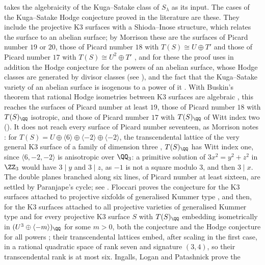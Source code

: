 \begin{remark}
\label{rem:mumfordks}
 takes the algebraicity of the Kuga--Satake class of
$S_{\lambda}$ as its input. The cases of the Kuga--Satake Hodge conjecture
proved in the literature are these. They include the projective K3 surfaces with
a Shioda--Inose structure, which relates the surface to an abelian surface;
by Morrison these are the surfaces of Picard number $19$ or $20$, those of
Picard number $18$ with $T(S)\cong U\oplus T'$ and those of Picard number
$17$ with $T(S)\cong U^{2}\oplus T'$
\cite[Theorem~6.3 and Corollary~6.4]{Mor84}, and for these the proof uses in
addition the Hodge conjecture for the powers of an abelian surface, whose
Hodge classes are generated by divisor classes (see \cite{MZ99}), and the
fact that the Kuga--Satake variety of an abelian surface is isogenous to a
power of it \cite{Mor85}. With Buskin's theorem that rational Hodge
isometries between K3 surfaces are algebraic \cite{Bus19}, this reaches the
surfaces of Picard number at least $19$, those of Picard number $18$ with
$T(S)_{\QQ}$ isotropic, and those of Picard number $17$ with $T(S)_{\QQ}$ of
Witt index two (). It does not reach every
surface of Picard number seventeen, as Morrison notes
\cite[Remark~7.2]{Mor84}: for
$T(S)=U\oplus\langle6\rangle\oplus\langle-2\rangle\oplus\langle-2\rangle$,
the transcendental lattice of the very general K3 surface of a family of
dimension three \cite[Corollary~2.10]{Mor84}, $T(S)_{\QQ}$ has Witt index one,
since $\langle6,-2,-2\rangle$ is anisotropic over $\QQ_{3}$: a primitive
solution of $3x^{2}=y^{2}+z^{2}$ in $\ZZ_{3}$ would have $3\mid y$ and
$3\mid z$, as $-1$ is not a square modulo $3$, and then $3\mid x$. The double planes branched along six lines, of Picard
number at least sixteen, are settled by Paranjape's cycle; see \cite{vG00}.
Floccari proves the conjecture for the K3 surfaces attached to projective
sixfolds of generalised Kummer type \cite{Flo24}, and then, for the K3
surfaces attached to all projective varieties of generalised Kummer type and
for every projective K3 surface $S$ with $T(S)_{\QQ}$ embedding isometrically
in $(U^{3}\oplus\langle-m\rangle)_{\QQ}$ for some $m>0$, both the conjecture
and the Hodge conjecture for all powers \cite[Theorems~1.2 and~5.11]{Flo25};
their transcendental lattices embed, after scaling in the first case, in a
rational quadratic space of rank seven and signature $(3,4)$, so their
transcendental rank is at most six. Ingalls, Logan and Patashnick prove the

\end{remark}
